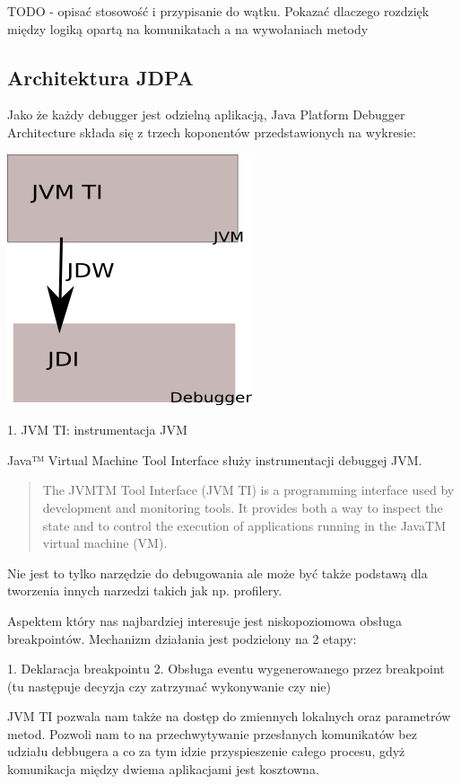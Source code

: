 TODO - opisać stosowość i przypisanie do wątku. Pokazać dlaczego rozdzięk między logiką opartą na komunikatach a na wywołaniach metody

\subsection{Architektura JDPA}

Jako że każdy debugger jest odzielną aplikacją, Java Platform Debugger Architecture składa się z trzech koponentów przedstawionych na wykresie:

\includegraphics{imgs/jdpa}

1. JVM TI: instrumentacja JVM

Java™ Virtual Machine Tool Interface służy instrumentacji debuggej JVM.

\begin{quote}
The JVMTM Tool Interface (JVM TI) is a programming interface used by development and monitoring tools. It provides both a way to inspect the state and to control the execution of applications running in the JavaTM virtual machine (VM). \cite{jvmtiSpec}
\end{quote}

Nie jest to tylko narzędzie do debugowania ale może być także podstawą dla tworzenia innych narzedzi takich jak np. profilery.

Aspektem który nas najbardziej interesuje jest niskopoziomowa obsługa breakpointów. Mechanizm działania jest podzielony na 2 etapy:

1. Deklaracja breakpointu
2. Obsługa eventu wygenerowanego przez breakpoint (tu następuje decyzja czy zatrzymać wykonywanie czy nie)

JVM TI pozwala nam także na dostęp do zmiennych lokalnych oraz parametrów metod. Pozwoli nam to na przechwytywanie przesłanych komunikatów bez udziału debbugera a co za tym idzie przyspieszenie całego procesu, gdyż komunikacja między dwiema aplikacjami jest kosztowna.


